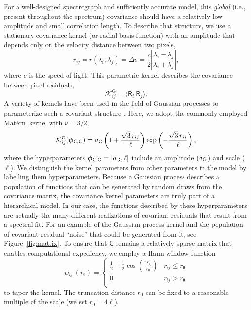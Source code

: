 \documentclass[iop,floatfix,numberedappendix,twocolappendix]{emulateapj}
\newcommand{\vR}{\mathsf{R}}
\newcommand{\vC}{\mathsf{C}}
\newcommand{\matern}{Mat\'{e}rn}
\newcommand{\vp}{ {\bm \phi}}
\newcommand{\KK}{\mathcal{K}}
\newcommand{\Kglobal}{\KK^{\textrm{G}}}
\begin{document}
For a well-designed spectrograph and sufficiently accurate model, this {\it global} (i.e., present 
throughout the spectrum) covariance should have a relatively low amplitude and small 
correlation length.  To describe that structure, we use a stationary covariance kernel (or radial 
basis function) with an amplitude that depends only on the velocity distance between two pixels, 
\begin{equation}
  r_{ij} = r(\lambda_i, \lambda_j) = \Delta v = \frac{c}{2} \left | \frac{\lambda_i 
   - \lambda_j}{ \lambda_i + \lambda_j} \right |,
\end{equation}
where $c$ is the speed of light.  This parametric kernel describes the covariance between pixel 
residuals, 
\begin{equation}
  \Kglobal_{ij} =  \langle \vR_i \; \vR_j \rangle.
  \label{eqn:expectation}
\end{equation}
A variety of kernels have been used in the field of Gaussian processes to parameterize such a 
covariant structure \citep[e.g.,][]{rasmussen05}.  Here, we adopt the commonly-employed \matern\ 
kernel with $\nu = 3/2$,
\begin{equation}
  \Kglobal_{ij}(\vp_{{\mathsf C}, {\rm G}}) = a_{\rm G} \left(1 + \frac{\sqrt{3}\, r_{ij}}{\ell} \right ) \exp 
   \left (- \frac{\sqrt{3}\, r_{ij}}{\ell} \right ),
   \label{eqn:global}
\end{equation}
where the hyperparameters $\vp_{{\mathsf C}, {\rm G}} = [a_{\rm G}, \ell]$ include an amplitude
($a_{\rm G}$) and scale ($\ell$). We distinguish the kernel parameters from other parameters in the
model by labelling them hyperparameters. Because a Gaussian process describes a population of
functions that can be generated by random draws from the covariance matrix, the covariance kernel
parameters are truly part of a hierarchical model. In our case, the functions described by these
hyperparameters are actually the many different realizations of covariant residuals that result from
a spectral fit. For an example of the Gaussian process kernel and the population of covariant
residual ``noise'' that could be generated from it, see Figure~\ref{fig:matrix}.
To ensure that $\vC$ remains a relatively sparse matrix that enables computational expediency, we
employ a Hann window function
\begin{equation}
  w_{ij} \,(r_0) = \left \{ 
    \begin{array}{cc}
    \frac{1}{2} + \frac{1}{2} \cos \left(\frac{\pi r_{ij}}{r_0} \right) & r_{ij} \le r_0 \\
    0 & r_{ij} > r_0 \\
  \end{array}
  \right .
  \label{eqn:Hann}
\end{equation}
to taper the kernel.  The truncation distance $r_0$ can be fixed to a reasonable multiple of the scale (we 
set $r_0 = 4\ell$).  
\end{document}
